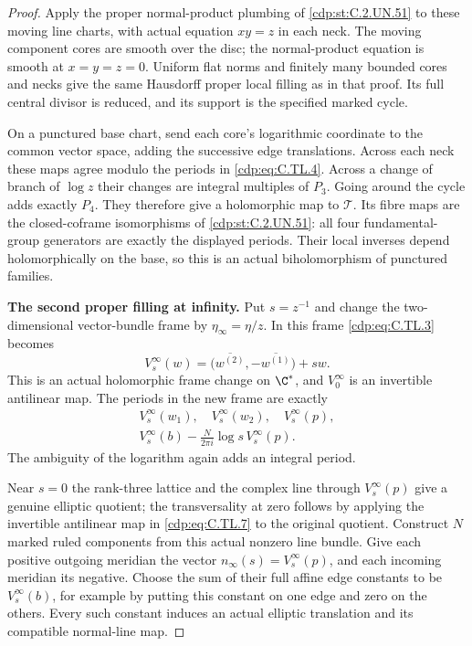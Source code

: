 \begin{proof}
Apply the proper normal-product plumbing of \ref{cdp:st:C.2.UN.51} to these
moving line charts, with actual equation $xy=z$ in each neck.
The moving component cores are smooth over the disc; the
normal-product equation is smooth at $x=y=z=0$.
Uniform flat norms and finitely many bounded cores and necks
give the same Hausdorff proper local filling as in that proof.
Its full central divisor is reduced, and its support is the
specified marked cycle.

On a punctured base chart, send each core's logarithmic
coordinate to the common vector space, adding the successive
edge translations. Across each neck these maps agree modulo
the periods in \eqref{cdp:eq:C.TL.4}. Across a change of branch of $\log z$
their changes are integral multiples of $P_3$. Going around
the cycle adds exactly $P_4$. They therefore give a holomorphic
map to $\mathcal T$. Its fibre maps are the closed-coframe
isomorphisms of \ref{cdp:st:C.2.UN.51}: all four fundamental-group generators
are exactly the displayed periods. Their local inverses
depend holomorphically on the base, so this is an actual
biholomorphism of punctured families.

\par\medskip\noindent\textbf{The second proper filling at infinity.}
Put $s=z^{-1}$ and change the two-dimensional vector-bundle
frame by $\eta_\infty=\eta/z$. In this frame \eqref{cdp:eq:C.TL.3} becomes
\[
 V^\infty_s(w)
       =\bigl(\overline{w^{(2)}},-\overline{w^{(1)}}\bigr)
                          +s w.
 \tag{C.TL.7}\label{cdp:eq:C.TL.7}
\]
This is an actual holomorphic frame change on $\C^*$, and
$V^\infty_0$ is an invertible antilinear map. The periods
in the new frame are exactly
\[
 \begin{gathered}
 V^\infty_s(w_1),\quad V^\infty_s(w_2),\quad V^\infty_s(p),\\
 V^\infty_s(b)
          -\frac{N}{2\pi i}\log s\,V^\infty_s(p).
 \end{gathered}
 \tag{C.TL.8}\label{cdp:eq:C.TL.8}
\]
The ambiguity of the logarithm again adds an integral period.

Near $s=0$ the rank-three lattice and the complex line through
$V^\infty_s(p)$ give a genuine elliptic quotient; the
transversality at zero follows by applying the invertible
antilinear map in \eqref{cdp:eq:C.TL.7} to the original quotient.
Construct $N$ marked ruled components from this actual
nonzero line bundle. Give each positive outgoing meridian
the vector $n_\infty(s)=V^\infty_s(p)$, and each incoming
meridian its negative. Choose the sum of their full affine
edge constants to be $V^\infty_s(b)$, for example by putting
this constant on one edge and zero on the others.
Every such constant induces an actual elliptic translation
and its compatible normal-line map.


\end{proof}
